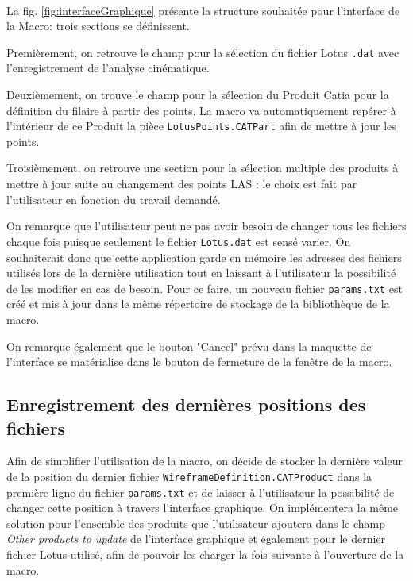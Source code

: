 \\

\par La fig. \ref{fig:interfaceGraphique} présente la structure souhaitée pour l'interface de la Macro: trois sections se définissent.
\par Premièrement, on retrouve le champ pour la sélection du fichier Lotus \texttt{.dat} avec l'enregistrement de l'analyse cinématique.
\par Deuxièmement, on trouve le champ pour la sélection du Produit Catia pour la définition du filaire à partir des points. La macro va automatiquement repérer à l'intérieur de ce Produit la pièce \texttt{LotusPoints.CATPart} afin de mettre à jour les points. 
\par Troisièmement, on retrouve une section pour la sélection multiple des produits à mettre à jour suite au changement des points LAS : le choix est fait par l'utilisateur en fonction du travail demandé.

\par On remarque que l'utilisateur peut ne pas avoir besoin de changer tous les fichiers chaque fois puisque seulement le fichier \texttt{Lotus.dat} est sensé varier. On souhaiterait donc que cette application garde en mémoire les adresses des fichiers utilisés lors de la dernière utilisation tout en laissant à l'utilisateur la possibilité de les modifier en cas de besoin. Pour ce faire, un nouveau fichier \texttt{params.txt} est créé et mis à jour dans le même répertoire de stockage de la bibliothèque de la macro.

\par On remarque également que le bouton "Cancel" prévu dans la maquette de l'interface se matérialise dans le bouton de fermeture de la fenêtre de la macro.


\subsection{Enregistrement des dernières positions des fichiers} %

\par Afin de simplifier l'utilisation de la macro, on décide de stocker la dernière valeur de la position du dernier fichier \texttt{WireframeDefinition.CATProduct} dans la première ligne du fichier \texttt{params.txt} et de laisser à l'utilisateur la possibilité de changer cette position à travers l'interface graphique. On implémentera la même solution pour l'ensemble des produits que l'utilisateur ajoutera dans le champ \textit{Other products to update} de l'interface graphique et également pour le dernier fichier Lotus utilisé, afin de pouvoir les charger la fois suivante à l'ouverture de la macro.

